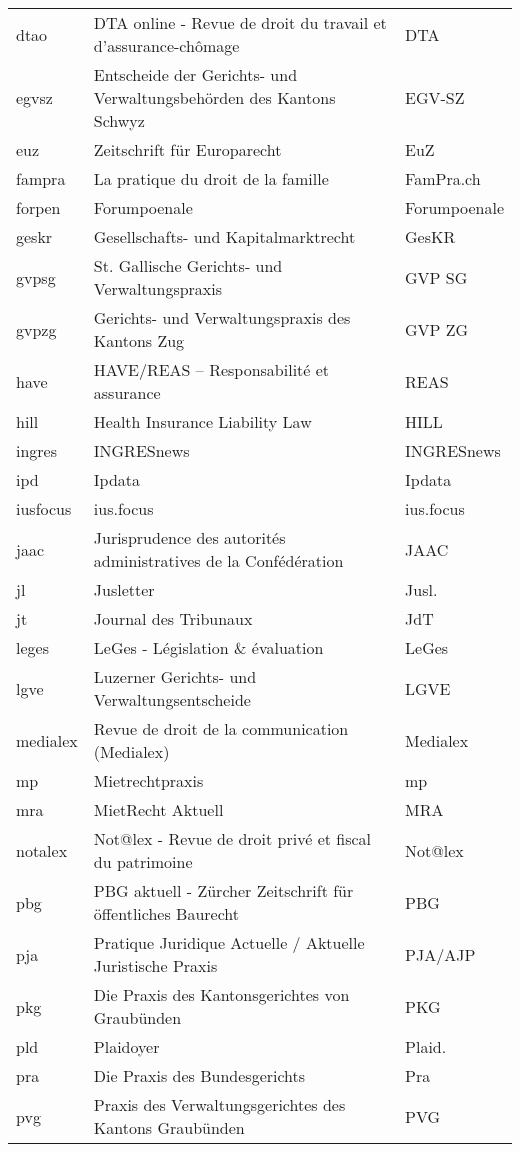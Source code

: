 \documentclass[a4paper]{ltxdockit}[2011/03/25]
\begin{document}
\begin{tabularx}{\textwidth}{@{}p{2.5cm}@{}p{9cm}@{}X@{}}
dtao & DTA online - Revue de droit du travail et d'assurance-chômage & DTA \\ 
egvsz & Entscheide der Gerichts- und Verwaltungsbehörden des Kantons Schwyz & EGV-SZ \\ 
euz & Zeitschrift für Europarecht & EuZ \\ 
fampra & La pratique du droit de la famille & FamPra.ch \\ 
forpen & Forumpoenale & Forumpoenale \\ 
geskr & Gesellschafts- und Kapitalmarktrecht & GesKR \\ 
gvpsg & St. Gallische Gerichts- und Verwaltungspraxis & GVP SG \\ 
gvpzg & Gerichts- und Verwaltungspraxis des Kantons Zug & GVP ZG \\ 
have & HAVE/REAS -- Responsabilité et assurance & REAS \\ 
hill & Health Insurance Liability Law & HILL \\ 
ingres & INGRESnews & INGRESnews \\ 
ipd & Ipdata & Ipdata \\ 
iusfocus & ius.focus & ius.focus\\
jaac & Jurisprudence des autorités administratives de la Confédération & JAAC \\ 
jl & Jusletter & Jusl. \\ 
jt & Journal des Tribunaux & JdT \\ 
leges & LeGes - Législation \& évaluation & LeGes \\ 
lgve & Luzerner Gerichts- und Verwaltungsentscheide & LGVE \\ 
medialex & Revue de droit de la communication (Medialex) & Medialex \\ 
mp & Mietrechtpraxis & mp \\ 
mra & MietRecht Aktuell & MRA \\ 
notalex & Not@lex - Revue de droit privé et fiscal du patrimoine & Not@lex \\ 
pbg & PBG aktuell - Zürcher Zeitschrift für öffentliches Baurecht & PBG \\ 
pja & Pratique Juridique Actuelle / Aktuelle Juristische Praxis & PJA/AJP \\ 
pkg & Die Praxis des Kantonsgerichtes von Graubünden & PKG \\ 
pld & Plaidoyer & Plaid. \\ 
pra & Die Praxis des Bundesgerichts & Pra \\ 
pvg & Praxis des Verwaltungsgerichtes des Kantons Graubünden & PVG \\ 
\bottomrule
\end{tabularx}
\end{document}

